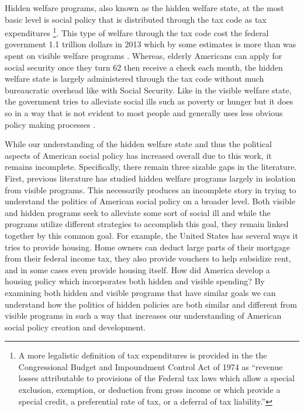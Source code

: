 \documentclass[12pt]{article}
\begin{document}
Hidden welfare programs, also known as the hidden welfare state, at the most basic level is social policy that is distributed through the tax code as tax expenditures \citep{howard1997}\footnote{A more legalistic definition of tax expenditures is provided in the the Congressional Budget and Impoundment Control Act of 1974 as ``revenue losses attributable to provisions of the Federal tax laws which allow a special exclusion, exemption, or deduction from gross income or which provide a special credit, a preferential rate of tax, or a deferral of tax liability.''}.  This type of welfare through the tax code cost the federal government 1.1 trillion dollars in 2013 which by some estimates is more than was spent on visible welfare programs \citep{omb2013}. Whereas, elderly Americans can apply for social security once they turn 62  then receive a check each month, the hidden welfare state is largely administered through the tax code without much bureaucratic overhead like with Social Security. Like in the visible welfare state, the government tries to alleviate social ills such as poverty or hunger but it does so in a way that is not evident to most people and generally uses less obvious policy making processes \citep{mettler2011}.

While our understanding of the hidden welfare state and thus the political aspects of American social policy has increased overall due to this work, it remains incomplete.  Specifically, there remain three sizable gaps in the literature. First, previous literature has studied hidden welfare programs largely in isolation from visible programs. This necessarily produces an incomplete story in trying to understand the politics of American social policy on a broader level. Both visible and hidden programs seek to alleviate some sort of social ill and while the programs utilize different strategies to accomplish this goal, they remain linked together by this common goal. For example, the United States has several ways it tries to provide housing. Home owners can deduct large parts of their mortgage from their federal income tax, they also provide vouchers to help subsidize rent, and in some cases even provide housing itself. How did America develop a housing policy which incorporates both hidden and visible spending? By examining both hidden and visible programs that have similar goals we can understand how the politics of hidden policies are both similar and different from visible programs in such a way that increases our understanding of American social policy creation and development.
\end{document}
